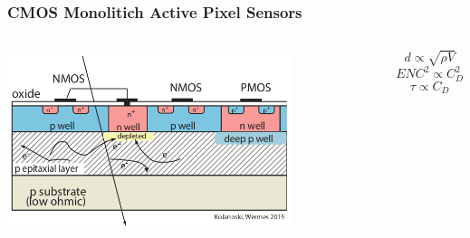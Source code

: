     \begin{frame}
        \frametitle{CMOS Monolitich Active Pixel Sensors}
        \begin{columns}
                \includegraphics[width=1.1\linewidth]{figures/Pixel_detectors/MAPS_scheme.png}
                \bigskip
                \begin{equation*}
                    \hspace{80pt} d \propto \sqrt{\rho V}
                \end{equation*}   
                \begin{equation*}
                    \hspace{80pt} ENC^2 \propto C_D ^2
                \end{equation*}  
                \begin{equation*}
                    \hspace{80pt} \tau \propto C_D

\end{equation*}
\end{columns}
\end{frame}
